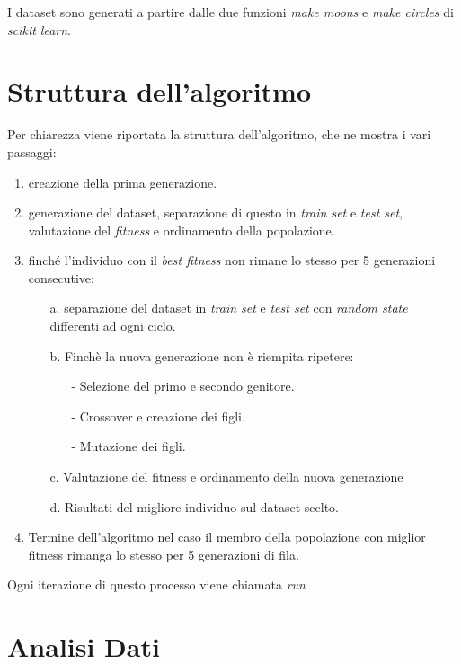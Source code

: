 \documentclass[12pt,a4paper]{report}
\begin{document}
I dataset sono generati a partire dalle due funzioni \textit{make moons} e \textit{make circles} di \textit{scikit learn}.


\section{Struttura dell'algoritmo }

Per chiarezza viene riportata la struttura dell'algoritmo, che ne mostra i vari passaggi:

\begin{enumerate}
 \item creazione della prima generazione.
 \item generazione del dataset, separazione di questo in \textit{train set} e \textit{test set}, valutazione del \textit{fitness} e ordinamento della popolazione.
 \item finché l'individuo con il \textit{best fitness} non rimane lo stesso per 5 generazioni consecutive:
 \begin{enumerate}
  \item[a.] separazione del dataset in \textit{train set} e \textit{test set} con \textit{random state} differenti ad ogni ciclo.
  \item[b.] Finchè la nuova generazione non è riempita ripetere:
  \begin{enumerate}
   \item [-] Selezione del primo e secondo genitore.
   \item [-] Crossover e creazione dei figli.
   \item [-] Mutazione dei figli.
  \end{enumerate}
  \item [c.] Valutazione del fitness e ordinamento della nuova generazione
  \item [d.] Risultati del migliore individuo sul dataset scelto.
 \end{enumerate}
 \item Termine dell'algoritmo nel caso il membro della popolazione con miglior fitness rimanga lo stesso per 5 generazioni di fila.
\end{enumerate}

Ogni iterazione di questo processo viene chiamata \textit{run}

\newpage

\section{Analisi Dati}
\end{document}
